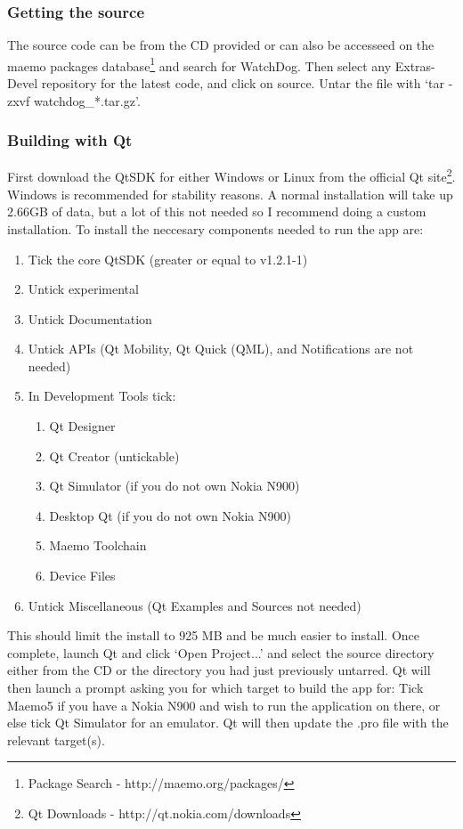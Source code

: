 \subsubsection{Getting the source}
The source code can be from the CD provided or can also be accesseed on the maemo packages database\footnote{Package Search - http://maemo.org/packages/} and search for WatchDog. Then select any Extras-Devel repository for the latest code, and click on source. Untar the file with ‘tar -zxvf  watchdog\_*.tar.gz’.
\subsubsection{Building with Qt}
First download the QtSDK for either Windows or Linux from the official Qt site\footnote{Qt Downloads - http://qt.nokia.com/downloads}. Windows is recommended for stability reasons. A normal installation will take up 2.66GB of data, but a lot of this not needed so I recommend doing a custom installation. To install the neccesary components needed to run the app are:
\begin{enumerate}
\item Tick the core QtSDK (greater or equal to v1.2.1-1)
\item Untick experimental
\item Untick Documentation
\item Untick APIs (Qt Mobility, Qt Quick (QML), and Notifications are not needed)
\item In Development Tools tick:
	\begin{enumerate}
	\item Qt Designer
	\item Qt Creator (untickable)
	\item Qt Simulator (if you do not own Nokia N900)
	\item Desktop Qt (if you do not own Nokia N900)
	\item Maemo Toolchain
	\item Device Files
	\end{enumerate}
\item Untick Miscellaneous (Qt Examples and Sources not needed)
\end{enumerate}
This should limit the install to 925 MB and be much easier to install. Once complete, launch Qt and click ‘Open Project...’ and select the source directory either from the CD or the directory you had just previously untarred. Qt will then launch a prompt asking you for which target to build the app for: Tick Maemo5 if you have a Nokia N900 and wish to run the application on there, or else tick Qt Simulator for an emulator. Qt will then update the .pro file with the relevant target(s).


